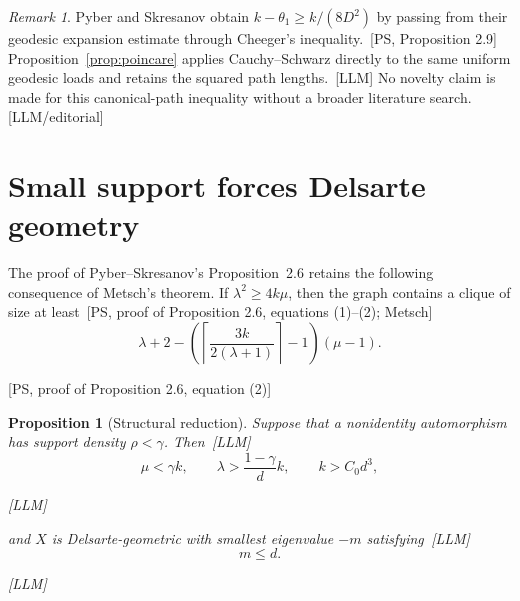 \documentclass[10pt]{amsart}
\newtheorem{proposition}[theorem]{Proposition}
\theoremstyle{remark}
\newtheorem{remark}[theorem]{Remark}
\newcommand{\prov}[1]{\unskip\, {\normalfont\scriptsize\color{provgray}\textsf{[#1]}}}
\newcommand{\eqprov}[1]{%
  \par\nobreak\vspace{-0.68\baselineskip}%
  \noindent\hfill{\normalfont\scriptsize\color{provgray}\textsf{[#1]}}%
  \par\vspace{0.20\baselineskip}%
}
\begin{document}
\begin{remark}
Pyber and Skresanov obtain $k-\theta_1\ge k/(8D^2)$ by passing from their geodesic expansion estimate through Cheeger's inequality.\prov{PS, Proposition 2.9} Proposition~\ref{prop:poincare} applies Cauchy--Schwarz directly to the same uniform geodesic loads and retains the squared path lengths.\prov{LLM} No novelty claim is made for this canonical-path inequality without a broader literature search.\prov{LLM/editorial}
\end{remark}

\section{Small support forces Delsarte geometry}
The proof of Pyber--Skresanov's Proposition~2.6 retains the following consequence of Metsch's theorem. If $\lambda^2\ge4k\mu$, then the graph contains a clique of size at least\prov{PS, proof of Proposition 2.6, equations (1)--(2); Metsch}
\begin{equation}
\lambda+2-\left(\left\lceil\frac{3k}{2(\lambda+1)}\right\rceil-1\right)(\mu-1).
\end{equation}
\eqprov{PS, proof of Proposition 2.6, equation (2)}

\begin{proposition}[Structural reduction]\label{prop:structural}
Suppose that a nonidentity automorphism has support density $\rho<\gamma$. Then\prov{LLM}
\begin{equation}
\mu<\gamma k,\qquad \lambda>\frac{1-\gamma}{d}k,\qquad k>C_0d^3,
\end{equation}
\eqprov{LLM}
and $X$ is Delsarte-geometric with smallest eigenvalue $-m$ satisfying\prov{LLM}
\begin{equation}
m\le d.
\end{equation}
\eqprov{LLM}
\end{proposition}
\end{document}
